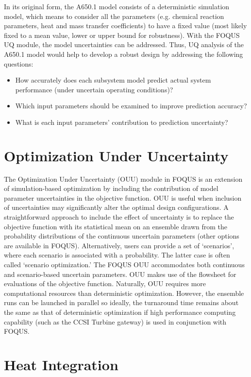 In its original form, the A650.1 model consists of a deterministic simulation model, which means to consider all the parameters (e.g. chemical reaction parameters, heat and mass transfer coefficients) to have a fixed value (most likely fixed to a mean value, lower or upper bound for robustness). With the FOQUS UQ module, the model uncertainties can be addressed. Thus, UQ analysis of the A650.1 model would help to develop a robust design by addressing the following questions:  
\begin{itemize}
	\item How accurately does each subsystem model predict actual system performance (under uncertain operating conditions)? 
	\item Which input parameters should be examined to improve prediction accuracy? 
	\item What is each input parameters' contribution to prediction uncertainty?
\end{itemize}

\section{Optimization Under Uncertainty}

The Optimization Under Uncertainty (OUU) module in FOQUS is an extension of simulation-based optimization by including the contribution of model
parameter uncertainties in the objective function. OUU is useful when inclusion of uncertainties may significantly alter the 
optimal design configurations. A straightforward approach to include the effect of uncertainty is to replace the objective 
function with its statistical mean on an ensemble drawn from the probability distributions of the continuous uncertain 
parameters (other options are available in FOQUS). Alternatively, users can provide a set of `scenarios', where each scenario is
associated with a probability. The latter case is often called `scenario optimization.' The FOQUS OUU accommodates both 
continuous and scenario-based uncertain parameters. OUU makes use of the flowsheet for evaluations of the objective function.
Naturally, OUU requires more computational resources than deterministic optimization. However, the ensemble runs can be
launched in parallel so ideally, the turnaround time remains about the same as that of deterministic optimization if
high performance computing capability (such as the CCSI Turbine gateway) is used in conjunction with FOQUS.

\section{Heat Integration}

